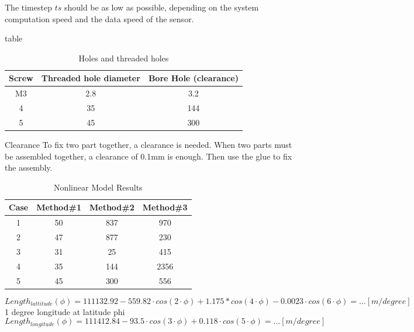 \documentclass[12pt,a4paper]{article}
\begin{document}
The timestep $ts$ should be as low as possible, depending on the system computation speed and the data speed of the sensor. 



table

\begin{table}[ht]
	\caption{Holes and threaded holes} %
	\centering %
	\begin{tabular}{c c c} %
		\hline\hline %
		Screw & Threaded hole diameter & Bore Hole (clearance) \\ [0.5ex] %
		\hline %
		M3 & 2.8 & 3.2 \\ %
		4 & 35 & 144 \\
		5 & 45 & 300 \\ [1ex] %
		\hline %
	\end{tabular}\label{table:nonlin} %
\end{table}

Clearance
To fix two part together, a clearance is needed.
When two parts must be assembled together, a clearance of 0.1mm is enough. Then use the glue to fix the assembly. 



\begin{table}[ht]
	\caption{Nonlinear Model Results} %
	\centering %
	\begin{tabular}{c c c c} %
		\hline\hline %
		Case & Method\#1 & Method\#2 & Method\#3 \\ [0.5ex] %
		\hline %
		1 & 50 & 837 & 970 \\ %
		2 & 47 & 877 & 230 \\
		3 & 31 & 25 & 415 \\
		4 & 35 & 144 & 2356 \\
		5 & 45 & 300 & 556 \\ [1ex] %
		\hline %
	\end{tabular}\label{table:nonlin} %
\end{table}



\begin{equation}
	Length_{lattitude}(\phi) = 111132.92-559.82 \cdot cos(2 \cdot \phi)+1.175*cos(4 \cdot \phi)-0.0023 \cdot cos(6 \cdot \phi)= ... [m/degree]
\end{equation}
 1 degree longitude at latitude phi
\begin{equation}
	Length_{longitude}(\phi) =
	111412.84-93.5 \cdot cos(3 \cdot \phi)+ 0.118 \cdot cos(5 \cdot \phi)= ... [m/degree]
\end{equation}
\end{document}
